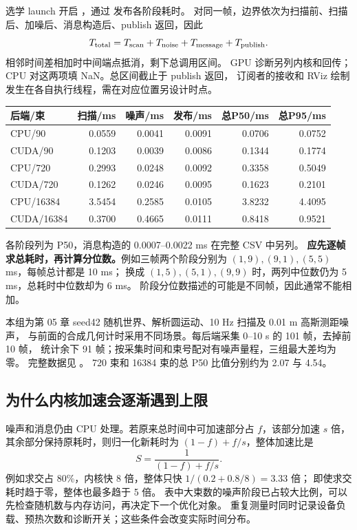选学 launch 开启 ，通过  发布各阶段耗时。
对同一帧，边界依次为扫描前、扫描后、加噪后、消息构造后、publish 返回，因此
\[
 T_{\rm total}=T_{\rm scan}+T_{\rm noise}+T_{\rm message}+T_{\rm publish}.
\]
相邻时间差相加时中间端点抵消，剩下总调用区间。
GPU 诊断另列内核和回传；CPU 对这两项填 NaN。总区间截止于 publish 返回，
订阅者的接收和 RViz 绘制发生在各自执行线程，需在对应位置另设计时点。
\begin{center}\small
\begin{tabular}{lrrrrr}\toprule
后端/束 & 扫描/ms & 噪声/ms & 发布/ms & 总P50/ms & 总P95/ms\\\midrule
CPU/90 & 0.0559 & 0.0041 & 0.0091 & 0.0706 & 0.0752\\
CUDA/90 & 0.1203 & 0.0039 & 0.0086 & 0.1344 & 0.1774\\
CPU/720 & 0.2993 & 0.0248 & 0.0092 & 0.3358 & 0.5049\\
CUDA/720 & 0.1262 & 0.0246 & 0.0095 & 0.1623 & 0.2101\\
CPU/16384 & 3.5454 & 0.2585 & 0.0105 & 3.8232 & 4.4095\\
CUDA/16384 & 0.3700 & 0.4665 & 0.0111 & 0.8418 & 0.9521\\\bottomrule
\end{tabular}
\end{center}
各阶段列为 P50，消息构造的 0.0007--0.0022 ms 在完整 CSV 中另列。
\textbf{应先逐帧求总耗时，再计算分位数。}例如三帧两个阶段分别为
$(1,9),(9,1),(5,5)$ ms，每帧总计都是 10 ms；
换成 $(1,5),(5,1),(9,9)$ 时，两列中位数仍为 5 ms，总耗时中位数却为 6 ms。
阶段分位数描述的可能是不同帧，因此通常不能相加。

本组为第 05 章 seed42 随机世界、解析圆运动、10 Hz 扫描及 0.01 m 高斯测距噪声，
与前面的合成几何计时采用不同场景。每后端采集 0--10 s 的 101 帧，去掉前 10 帧，
统计余下 91 帧；按采集时间和束号配对有噪声量程，三组最大差均为零。
完整数据见 。
720 束和 16384 束的总 P50 比值分别约为 2.07 与 4.54。

\subsection{为什么内核加速会逐渐遇到上限}
噪声和消息仍由 CPU 处理。若原来总时间中可加速部分占 $f$，该部分加速 $s$ 倍，
其余部分保持原耗时，则归一化新耗时为 $(1-f)+f/s$，整体加速比是
\[
 S=\frac1{(1-f)+f/s}.
\]
例如求交占 80\%，内核快 8 倍，整体只快 $1/(0.2+0.8/8)=3.33$ 倍；
即使求交耗时趋于零，整体也最多趋于 5 倍。
表中大束数的噪声阶段已占较大比例，可以先检查随机数与内存访问，再决定下一个优化对象。
重复测量时同时记录设备负载、预热次数和诊断开关；这些条件会改变实际时间分布。

